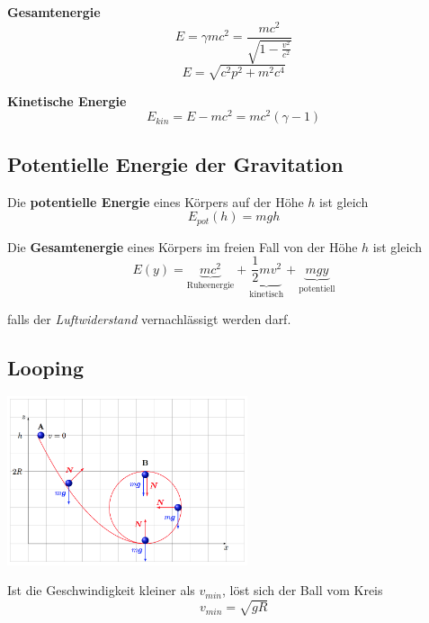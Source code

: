 \documentclass[7pt]{article}
\begin{document}
\begin{multicols*}{3}
\textbf{Gesamtenergie}
\begin{equation*}
	E = \gamma mc^2 = \frac{mc^2}{\sqrt{1-\frac{v^2}{c^2}}}
\end{equation*}
\begin{equation}
	E=\sqrt{c^2p^2+m^2c^4}
\end{equation}

\textbf{Kinetische Energie}
\begin{equation*}
	E_{kin} = E - mc^2 = mc^2(\gamma - 1)
\end{equation*}

\subsection{Potentielle Energie der Gravitation}

Die \textbf{potentielle Energie} eines K{\"o}rpers auf der H{\"o}he $h$ ist gleich
\begin{equation*}
	E_{pot}(h) = mgh
\end{equation*}

Die \textbf{Gesamtenergie} eines K{\"o}rpers im freien Fall von der H{\"o}he $h$ ist gleich
\begin{equation*}
	E(y) = \underbrace{mc^2}_\text{Ruheenergie} + \underbrace{\frac{1}{2}mv^2}_\text{kinetisch} + \underbrace{mgy}_\text{potentiell}
\end{equation*}

falls der \emph{Luftwiderstand} vernachl{\"a}ssigt werden darf.

\subsection{Looping}

\begin{center}
	\includegraphics[width=200pt]{images/looping}
\end{center}

Ist die Geschwindigkeit kleiner als $v_{min}$, l{\"o}st sich der Ball vom Kreis
\begin{equation*}
	v_{min} = \sqrt{gR}
\end{equation*}


\end{multicols*}
\end{document}
